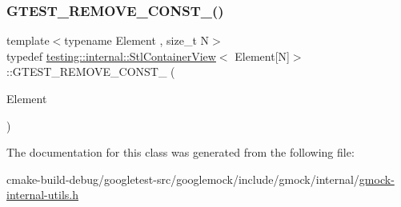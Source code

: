 \mbox{\label{classtesting_1_1internal_1_1StlContainerView_3_01Element[N]_4_af8c1aa62de6f8a5d3126c7b3badfefdb}} 
\subsubsection{\texorpdfstring{GTEST\_REMOVE\_CONST\_()}{GTEST\_REMOVE\_CONST\_()}}
{\footnotesize\ttfamily template$<$typename Element , size\+\_\+t N$>$ \\
typedef \mbox{\hyperlink{classtesting_1_1internal_1_1StlContainerView}{testing\+::internal\+::\+Stl\+Container\+View}}$<$ Element\mbox{[}N\mbox{]}$>$\+::G\+T\+E\+S\+T\+\_\+\+R\+E\+M\+O\+V\+E\+\_\+\+C\+O\+N\+S\+T\+\_\+ (\begin{DoxyParamCaption}\item[{Element}]{ }\end{DoxyParamCaption})}



The documentation for this class was generated from the following file\+:\begin{DoxyCompactItemize}
\item 
cmake-\/build-\/debug/googletest-\/src/googlemock/include/gmock/internal/\mbox{\hyperlink{gmock-internal-utils_8h}{gmock-\/internal-\/utils.\+h}}\end{DoxyCompactItemize}
